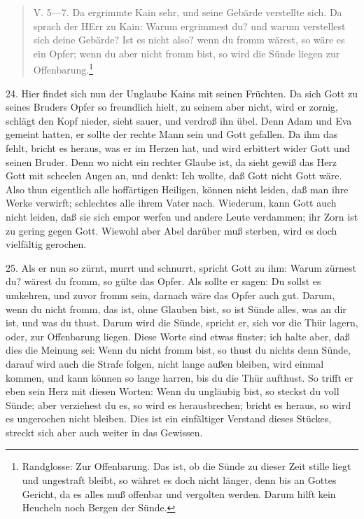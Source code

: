 \begin{quote}
V. 5—7. Da ergrimmte Kain sehr, und seine Gebärde verstellte sich. Da sprach der HErr zu Kain: Warum ergrimmest du? und warum verstellest sich deine Gebärde? Ist es nicht also? wenn du fromm wärest, so wäre es ein Opfer; wenn du aber nicht fromm bist, so wird die Sünde liegen zur Offenbarung.\footnote{Randglosse: Zur Offenbarung. Das ist, ob die Sünde zu dieser Zeit stille liegt und ungestraft bleibt, so
währet es doch nicht länger, denn bis an Gottes Gericht, da es alles muß offenbar und vergolten werden. Darum hilft kein Heucheln noch Bergen der Sünde.}
\end{quote}
24. Hier findet sich nun der Unglaube Kains mit seinen Früchten. Da sich Gott zu seines Bruders Opfer so freundlich hielt, zu seinem aber nicht, wird er zornig, schlägt den Kopf nieder, sieht sauer, und verdroß ihn übel. Denn Adam und Eva gemeint hatten, er sollte der rechte Mann sein und Gott gefallen. Da ihm das fehlt, bricht es heraus, was er im Herzen hat, und wird erbittert wider Gott und seinen Bruder. Denn wo nicht ein rechter Glaube ist, da sieht gewiß das Herz Gott mit scheelen Augen an, und denkt: Ich wollte, daß Gott nicht Gott wäre. Also thun eigentlich alle hoffärtigen Heiligen, können nicht leiden, daß man ihre Werke verwirft; schlechtes alle ihrem Vater nach. Wiederum, kann Gott auch nicht leiden, daß sie sich empor werfen und andere Leute verdammen; ihr Zorn ist zu gering gegen Gott. Wiewohl aber Abel darüber muß sterben, wird es doch vielfältig gerochen.

25. Als er nun so zürnt, murrt und schnurrt, spricht Gott zu ihm: Warum zürnest du? wärest du fromm, so gülte das Opfer. Als sollte er sagen: Du sollst es umkehren, und zuvor fromm sein, darnach wäre das Opfer auch gut. Darum, wenn du nicht fromm, das ist, ohne Glauben bist, so ist Sünde alles, was an dir ist, und was du thust. Darum wird die Sünde, spricht er, sich vor die Thür lagern, oder, zur Offenbarung liegen. Diese Worte sind etwas finster; ich halte aber, daß dies die Meinung sei: Wenn du nicht fromm bist, so thust du nichts denn Sünde, darauf wird auch die Strafe folgen, nicht lange außen bleiben, wird einmal kommen, und kann können so lange harren, bis du die Thür aufthust. So trifft er eben sein Herz mit diesen Worten: Wenn du ungläubig bist, so steckst du voll Sünde; aber verziehest du es, so wird es herausbrechen; bricht es heraus, so wird es ungerochen nicht bleiben. Dies ist ein einfältiger Verstand dieses Stückes, streckt sich aber auch weiter in das Gewissen.

